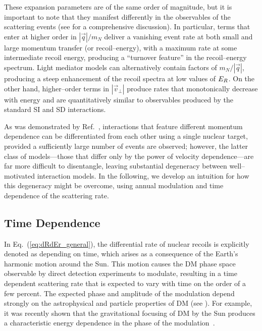 \documentclass[11pt]{article}
\newcommand{\Eq}[1]{Eq.~(\ref{#1})} \newcommand{\Eqs}[2]{Eqs.~(\ref{#1}) and (\ref{#2})} \newcommand{\Eqm}[2]{Eqs.~(\ref{#1}) through (\ref{#2})}
\begin{document}
These expansion parameters are of the same order of magnitude, but it is important to note that they manifest differently in the observables of the scattering events (see \eg \cite{Gluscevic:2015sqa} for a comprehensive discussion). In particular, terms that enter at higher order in $|\vec q|/m_N$ deliver a vanishing event rate at both small and large momentum transfer (or recoil--energy), with a maximum rate at some intermediate recoil energy, producing a ``turnover feature'' in the recoil--energy spectrum. Light mediator models can alternatively contain factors of $m_N/|\vec q|$, producing a steep enhancement of the recoil spectra at low values of $E_R$. On the other hand, higher--order terms in $| \vec v_\perp|$ produce rates that monotonically decrease with energy and are quantitatively similar to observables produced by the standard SI and SD interactions. 

As was demonstrated by Ref.~\cite{Gluscevic:2015sqa}, interactions that feature different momentum dependence can be differentiated from each other using a single nuclear target, provided a sufficiently large number of events are observed; however, the latter class of models---those that differ only by the power of velocity dependence---are far more difficult to disentangle, leaving substantial degeneracy between well--motivated interaction models. In the following, we develop an intuition for how this degeneracy might be overcome, using annual modulation and time dependence of the scattering rate.

\subsection{Time Dependence}
\label{subsec:time}

In \Eq{eq:dRdEr_general}, the differential rate of nuclear recoils is explicitly denoted as depending on time, which arises as a consequence of the Earth's harmonic motion around the Sun. This motion causes the DM phase space observable by direct detection experiments to modulate, resulting in a time dependent scattering rate that is expected to vary with time on the order of a few percent. The expected phase and amplitude of the modulation depend strongly on the astrophysical and particle properties of DM (see \eg \cite{Green:2000ga,Gelmini:2000dm,DelNobile:2015nua}). For example, it was recently shown that the gravitational focusing of DM by the Sun produces a characteristic energy dependence in the phase of the modulation~\cite{Danby01021957,Griest:1987vc,Sikivie:2002bj,Alenazi:2006wu,Lee:2013wza,DelNobile:2015nua}. 
\end{document}
